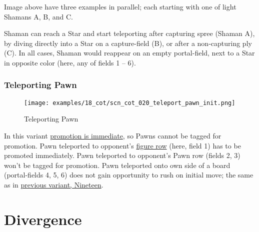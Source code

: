 \vspace*{-0.4\baselineskip}
Image above have three examples in parallel; each starting with one of light
Shamans A, B, and C.

Shaman can reach a Star and start teleporting after capturing spree (Shaman A),
by diving directly into a Star on a capture-field (B), or after a non-capturing
ply (C). In all cases, Shaman would reappear on an empty portal-field, next to a
Star in opposite color (here, any of fields 1 -- 6).

\clearpage %

\subsubsection*{Teleporting Pawn}
\label{sec:Conquest of Tlalocan/Shaman/Movement/Teleporting Pawn}

\vspace*{-1.4\baselineskip}
\noindent
\begin{figure}[!h]
\texttt{[image: examples/18\_cot/scn\_cot\_020\_teleport\_pawn\_init.png]}
\vspace*{-1.4\baselineskip}
\caption{Teleporting Pawn}
\label{fig:scn_cot_020_teleport_pawn_init}
\end{figure}

\vspace*{-0.4\baselineskip}
In this variant
\hyperref[sec:Conquest of Tlalocan/Promotion]{promotion is immediate}, so Pawns
cannot be tagged for promotion.
Pawn teleported to opponent's \hyperref[sec:Terms/Figure row]{figure row} (here,
field 1) has to be promoted immediately. Pawn teleported to opponent's Pawn row
(fields 2, 3) won't be tagged for promotion. \newline
\indent
Pawn teleported onto own side of a board (portal-fields 4, 5, 6) does not gain
opportunity to rush on initial move; the same as in
\hyperref[fig:scn_n_12_teleport_pawns_step_1]{previous variant, Nineteen}.

\clearpage %

\section*{Divergence}
\label{sec:Conquest of Tlalocan/Divergence}

